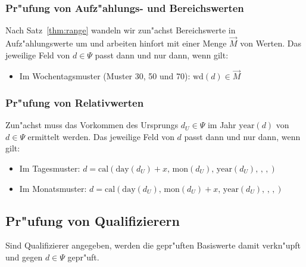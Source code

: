 \documentclass[a4paper]{article}
\newcommand*{\dayf}{\mathrm{day}}
\newcommand*{\monf}{\mathrm{mon}}
\newcommand*{\yearf}{\mathrm{year}}
\newcommand*{\wdf}{\mathrm{wd}}
\newcommand*{\calf}{\mathrm{cal}}
\numberwithin{equation}{section}
\begin{document}
\subsubsection{Pr"ufung von Aufz"ahlungs- und Bereichswerten}
Nach Satz~\ref{thm:range} wandeln wir zun"achst Bereichswerte in
Aufz"ahlungswerte um und arbeiten hinfort mit einer Menge $\vec{M}$ von Werten.
Das jeweilige Feld von $d \in \Psi$ passt dann und nur dann, wenn gilt:
\begin{itemize}
  \item Im Wochentagsmuster (Muster 30, 50 und 70): $\wdf(d) \in \vec{M}$
\end{itemize}

\subsubsection{Pr"ufung von Relativwerten}
Zun"achst muss das Vorkommen des Ursprungs $d_U \in \Psi$ im Jahr $\yearf(d)$
von $d \in \Psi$ ermittelt werden. Das jeweilige Feld von $d$ passt dann und nur
dann, wenn gilt:
\begin{itemize}
  \item Im Tagesmuster: $d = \calf(\dayf(d_U) + x,\,\monf(d_U),\,\yearf(d_U),\,,\,,)$
  \item Im Monatsmuster: $d = \calf(\dayf(d_U),\,\monf(d_U) + x,\,\yearf(d_U),\,,\,,)$
\end{itemize}


%
%
\subsection{Pr"ufung von Qualifizierern}
Sind Qualifizierer angegeben, werden die gepr"uften Basiswerte damit verkn"upft
und gegen $d \in \Psi$ gepr"uft.
\end{document}
